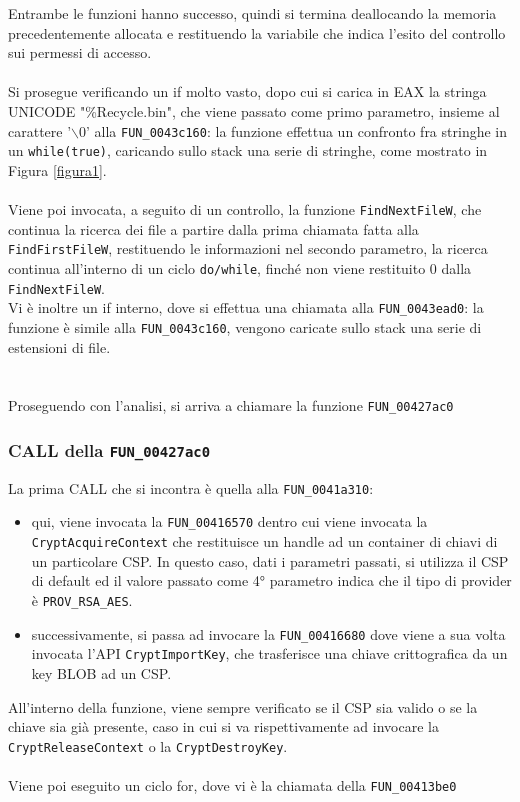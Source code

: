 \documentclass[12pt]{extarticle}
\begin{document}
Entrambe le funzioni hanno successo, quindi si termina deallocando la memoria precedentemente allocata e restituendo la variabile che indica l'esito del controllo sui permessi di accesso.\\\\Si prosegue verificando un if molto vasto, dopo cui si carica in EAX la stringa UNICODE "\%Recycle.bin", che viene passato come primo parametro, insieme al carattere '$\backslash$0' alla \texttt{FUN\_0043c160}: la funzione effettua un confronto fra stringhe in un \texttt{while(true)}, caricando sullo stack una serie di stringhe, come mostrato in Figura \ref{figura1}.\\\\Viene poi invocata, a seguito di un controllo, la funzione \texttt{FindNextFileW}, che continua la ricerca dei file a partire dalla prima chiamata fatta alla \texttt{FindFirstFileW}, restituendo le informazioni nel secondo parametro, la ricerca continua all'interno di un ciclo \texttt{do/while}, finché non viene restituito 0 dalla \texttt{FindNextFileW}.\\Vi è inoltre un if interno, dove si effettua una chiamata alla \texttt{FUN\_0043ead0}: la funzione è simile alla \texttt{FUN\_0043c160}, vengono caricate sullo stack una serie di estensioni di file.\\\\\\Proseguendo con l'analisi, si arriva a chiamare la funzione \texttt{FUN\_00427ac0}


\subsubsection{CALL della \texttt{FUN\_00427ac0}} La prima CALL che si incontra è quella alla \texttt{FUN\_0041a310}:
\begin{itemize}
    \item qui, viene invocata la \texttt{FUN\_00416570} dentro cui viene invocata la \texttt{CryptAcquireContext} che restituisce un handle ad un container di chiavi di un particolare CSP. In questo caso, dati i parametri passati, si utilizza il CSP di default ed il valore passato come 4° parametro indica che il tipo di provider è \texttt{PROV\_RSA\_AES}.
    \item successivamente, si passa ad invocare la \texttt{FUN\_00416680} dove viene a sua volta invocata l'API \texttt{CryptImportKey}, che trasferisce una chiave crittografica da un key BLOB ad un CSP.
\end{itemize}
All'interno della funzione, viene sempre verificato se il CSP sia valido o se la chiave sia già presente, caso in cui si va rispettivamente ad invocare la \texttt{CryptReleaseContext} o la \texttt{CryptDestroyKey}.\\\\Viene poi eseguito un ciclo for, dove vi è la chiamata della \texttt{FUN\_00413be0}
\end{document}
